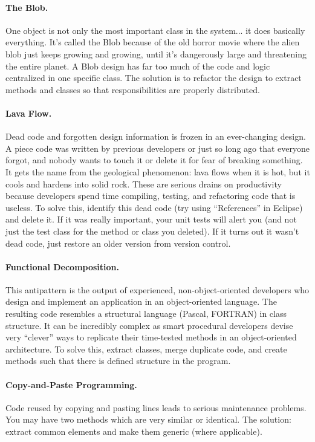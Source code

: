 \paragraph{The Blob.}
One object is not only the most important class in the system... it does basically everything. It's called the Blob because of the old horror movie where the alien blob just keeps growing and growing, until it's dangerously large and threatening the entire planet. A Blob design has far too much of the code and logic centralized in one specific class. The solution is to refactor the design to extract methods and classes so that responsibilities are properly distributed. 


\paragraph{Lava Flow.}
Dead code and forgotten design information is frozen in an ever-changing design. A piece code was written by previous developers or just so long ago that everyone forgot, and nobody wants to touch it or delete it for fear of breaking something. It gets the name from the geological phenomenon: lava flows when it is hot, but it cools and hardens into solid rock. These are serious drains on productivity because developers spend time compiling, testing, and refactoring code that is useless. To solve this, identify this dead code (try using ``References'' in Eclipse) and delete it. If it was really important, your unit tests will alert you (and not just the test class for the method or class you deleted). If it turns out it wasn't dead code, just restore an older version from version control.

\paragraph{Functional Decomposition.}
This antipattern is the output of experienced, non-object-oriented developers who design and implement an application in an object-oriented language. The resulting code resembles a structural language (Pascal, FORTRAN) in class structure. It can be incredibly complex as smart procedural developers devise very ``clever'' ways to replicate their time-tested methods in an object-oriented architecture. To solve this, extract classes, merge duplicate code, and create methods such that there is defined structure in the program.

\paragraph{Copy-and-Paste Programming.}
Code reused by copying and pasting lines leads to serious maintenance problems. You may have two methods which are very similar or identical. The solution: extract common elements and make them generic (where applicable). 

